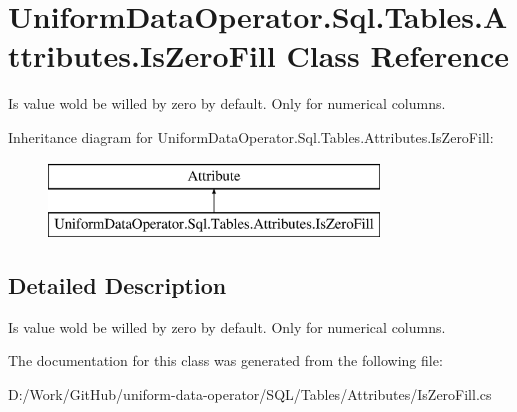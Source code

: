 \hypertarget{class_uniform_data_operator_1_1_sql_1_1_tables_1_1_attributes_1_1_is_zero_fill}{}\section{Uniform\+Data\+Operator.\+Sql.\+Tables.\+Attributes.\+Is\+Zero\+Fill Class Reference}
\label{class_uniform_data_operator_1_1_sql_1_1_tables_1_1_attributes_1_1_is_zero_fill}


Is value wold be willed by zero by default. Only for numerical columns.  


Inheritance diagram for Uniform\+Data\+Operator.\+Sql.\+Tables.\+Attributes.\+Is\+Zero\+Fill\+:\begin{figure}[H]
\begin{center}
\leavevmode
\includegraphics[height=2.000000cm]{dd/d00/class_uniform_data_operator_1_1_sql_1_1_tables_1_1_attributes_1_1_is_zero_fill}
\end{center}
\end{figure}


\subsection{Detailed Description}
Is value wold be willed by zero by default. Only for numerical columns. 



The documentation for this class was generated from the following file\+:\begin{DoxyCompactItemize}
\item 
D\+:/\+Work/\+Git\+Hub/uniform-\/data-\/operator/\+S\+Q\+L/\+Tables/\+Attributes/Is\+Zero\+Fill.\+cs\end{DoxyCompactItemize}
